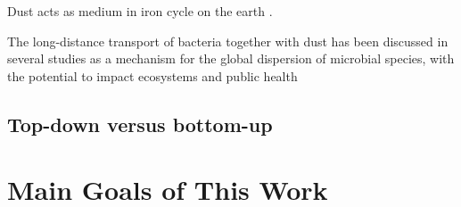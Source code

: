   Dust acts as medium in iron cycle on the earth \citep{jickells05}. 

  The long-distance transport of bacteria together with dust 
  has been discussed in several studies as a mechanism for 
  the global dispersion of microbial species, 
  with the potential to impact ecosystems and public health
  \citep{griffin01,burrows09}

\subsection{Top-down versus bottom-up}

\section{Main Goals of This Work}

